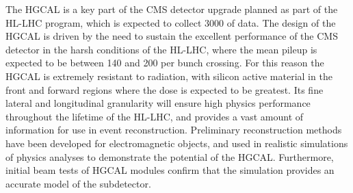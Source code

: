 The HGCAL is a key part of the CMS detector upgrade planned as part of the HL-LHC program, 
which is expected to collect \SI{3000}{\fbinv} of data.
The design of the HGCAL is driven by the need to sustain the excellent performance of the CMS detector
in the harsh conditions of the HL-LHC, 
where the mean pileup is expected to be between 140 and 200 per bunch crossing.
For this reason the HGCAL is extremely resistant to radiation, 
with silicon active material in the front and forward regions where the dose is expected to be greatest.
Its fine lateral and longitudinal granularity will ensure high physics performance throughout the
lifetime of the HL-LHC, and provides a vast amount of information for use in event reconstruction.
Preliminary reconstruction methods have been developed for electromagnetic objects, 
and used in realistic simulations of physics analyses to demonstrate the potential of the HGCAL.
Furthermore, initial beam tests of HGCAL modules confirm 
that the simulation provides an accurate model of the subdetector.
